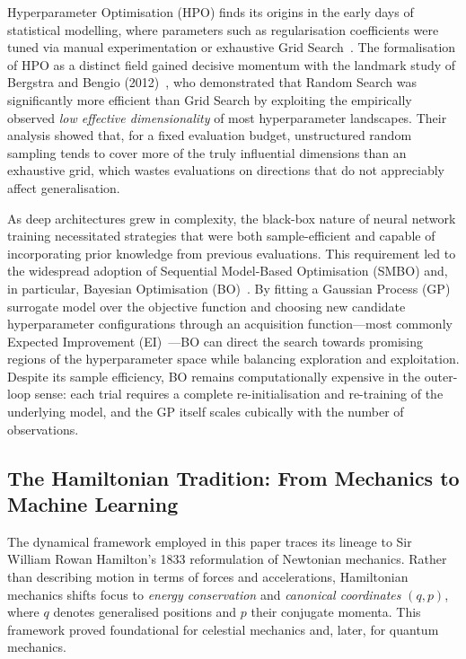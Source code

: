 \documentclass[11pt]{article}
\begin{document}
Hyperparameter Optimisation (HPO) finds its origins in the early days
of statistical modelling, where parameters such as regularisation
coefficients were tuned via manual experimentation or exhaustive Grid
Search~\cite{lecun2015,raiaan2024}.  The formalisation of HPO as a
distinct field gained decisive momentum with the landmark study of
Bergstra and Bengio (2012)~\cite{bergstra2012}, who demonstrated that
Random Search was significantly more efficient than Grid Search by
exploiting the empirically observed \emph{low effective dimensionality}
of most hyperparameter landscapes.  Their analysis showed that, for a
fixed evaluation budget, unstructured random sampling tends to cover
more of the truly influential dimensions than an exhaustive grid, which
wastes evaluations on directions that do not appreciably affect
generalisation.

As deep architectures grew in complexity, the black-box nature of
neural network training necessitated strategies that were both
sample-efficient and capable of incorporating prior knowledge from
previous evaluations.  This requirement led to the widespread adoption
of Sequential Model-Based Optimisation (SMBO) and, in particular,
Bayesian Optimisation (BO)~\cite{snoek2012}.  By fitting a Gaussian
Process (GP) surrogate model over the objective function and choosing
new candidate hyperparameter configurations through an acquisition
function—most commonly Expected Improvement (EI)~\cite{mockus1975}—BO
can direct the search towards promising regions of the hyperparameter
space while balancing exploration and exploitation.  Despite its
sample efficiency, BO remains computationally expensive in the
outer-loop sense: each trial requires a complete re-initialisation and
re-training of the underlying model, and the GP itself scales
cubically with the number of observations.

\subsection{The Hamiltonian Tradition: From Mechanics to Machine Learning}

The dynamical framework employed in this paper traces its lineage to
Sir William Rowan Hamilton's 1833 reformulation of Newtonian mechanics.
Rather than describing motion in terms of forces and accelerations,
Hamiltonian mechanics shifts focus to \emph{energy conservation} and
\emph{canonical coordinates} $(q, p)$, where $q$ denotes generalised
positions and $p$ their conjugate momenta.  This framework proved
foundational for celestial mechanics and, later, for quantum mechanics.
\end{document}
